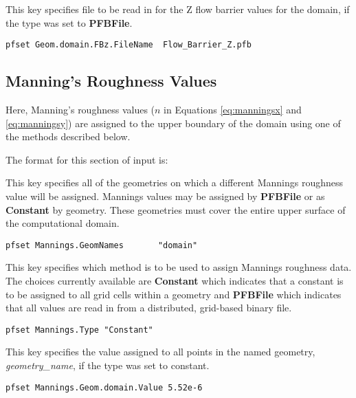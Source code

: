 {
This key specifies file to be read in for the Z flow barrier values for the domain, if the type was set to {\bf PFBFile}.
}
\begin{display}\begin{verbatim}
pfset Geom.domain.FBz.FileName  Flow_Barrier_Z.pfb
\end{verbatim}\end{display}

\subsection{Manning's Roughness Values}
\label{Manning's Roughness Values}

Here, Manning's roughness values ($n$ in Equations \ref{eq:manningsx} and \ref{eq:manningsy}) are assigned to the upper boundary of the domain using one of the methods described below.

The format for this section of input is:

{
This key specifies all of the geometries on which a different Mannings roughness value will be
assigned.  Mannings values may be assigned by {\bf PFBFile} or as {\bf Constant} by geometry.  These geometries must cover the entire upper surface of the computational domain.
}
\begin{display}\begin{verbatim}
pfset Mannings.GeomNames       "domain"
\end{verbatim}\end{display}

{
This key specifies which method is to be used to assign Mannings roughness data.  The choices currently
available are {\bf Constant} which indicates that a constant is to be
assigned to all grid cells within a geometry and {\bf PFBFile} which indicates that all values are read in from a distributed, grid-based \parflow{} binary file.
}
\begin{display}\begin{verbatim}
pfset Mannings.Type "Constant"
\end{verbatim}\end{display}

{
This key specifies the value assigned to all points in the named
geometry, {\em geometry\_name}, if the type was set to constant.
}
\begin{display}\begin{verbatim}
pfset Mannings.Geom.domain.Value 5.52e-6
\end{verbatim}\end{display}

